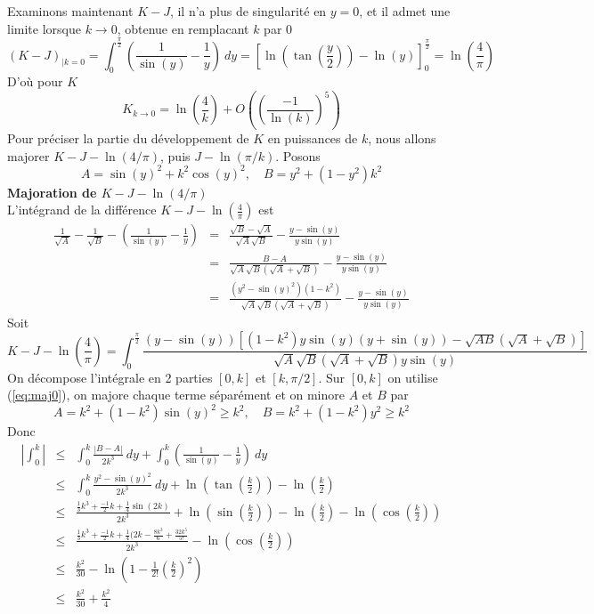 \documentclass[a4paper,11pt]{article}
\begin{document}
Examinons maintenant $K-J$, il n'a plus de singularit\'e en $y=0$, et il admet une limite
lorsque $k \rightarrow 0$, obtenue en remplacant $k$ par 0
\[ (K-J)_{|k=0} = \int_0^{\frac{\pi}{2}} \left(\frac{1}{\sin(y)}-\frac{1}{y}\right)
\ dy = \left[\ln\left(\tan\left(\frac{y}{2}\right)\right) - \ln(y) \right]_0^{\frac{\pi}{2}} =
\ln(\frac{4}{\pi})\]
D'o\`u pour $K$
\[ K_{k \rightarrow 0} = \ln\left(\frac{4}{k}\right) + O( \left(\frac{-1}{\ln(k)}\right)^5)\]
Pour pr\'eciser la partie du d\'eveloppement de $K$ en puissances de $k$, nous allons
majorer $K-J-\ln(4/\pi)$, puis $J-\ln(\pi/k)$.
Posons
\[ A=\sin(y)^2+k^2 \cos(y)^2, \quad B=y^2+(1-y^2)k^2\]
{\bf Majoration de $K-J-\ln(4/\pi)$}\\
L'int\'egrand de la diff\'erence $K-J-\ln(\frac{4}{\pi})$ est
\begin{eqnarray}  
\frac{1}{\sqrt{A}} - \frac{1}{\sqrt{B}} - 
\left( \frac{1}{\sin(y)}-\frac{1}{y} \right)
&= &
\frac{\sqrt{B}-\sqrt{A}}{\sqrt{A} \sqrt{B}} -
\frac{y-\sin(y)}{y\sin(y)} 
 \\
&= &
\frac{B-A}{\sqrt{A} \sqrt{B} (\sqrt{A}+\sqrt{B})} -
\frac{y-\sin(y)}{y\sin(y)} \label{eq:maj0}
 \\
&=& \frac{(y^2-\sin(y)^2)(1-k^2)}{\sqrt{A} \sqrt{B} (\sqrt{A}+\sqrt{B})}
- \frac{y-\sin(y)}{y\sin(y)} \label{eq:maj1}
\end{eqnarray}
Soit
\begin{equation} \label{eq:maj2}
 K-J-\ln(\frac{4}{\pi})= \int_0^{\frac{\pi}{2}} 
\frac{(y-\sin(y))[(1-k^2)y \sin(y)(y+\sin(y))-\sqrt{AB}(\sqrt{A}+\sqrt{B})]}
{\sqrt{A} \sqrt{B} (\sqrt{A}+\sqrt{B})y\sin(y)}
\end{equation}
On décompose l'intégrale en 2 parties $[0,k]$ et $[k,\pi/2]$.
Sur $[0,k]$ on utilise (\ref{eq:maj0}), on majore chaque terme séparément
et on minore $A$ et $B$ par
\[ A=k^2+(1-k^2)\sin(y)^2 \geq k^2, \quad B=k^2+(1-k^2)y^2 \geq k^2\]
Donc
\begin{eqnarray*} 
| \int_0^{k} | &\leq &\int_0^k \frac{|B-A|}{2k^3} \ dy + \int_0^k ( \frac{1}{\sin(y)}-\frac{1}{y} ) 
\ dy \\
&\leq& \int_0^k \frac{y^2-\sin(y)^2}{2k^3} \ dy + \ln (\tan(\frac{k}{2})) -\ln(\frac{k}{2}) \\
&\leq & \frac{\frac{1}{3} k^{3}+\frac{-1}{2} k+\frac{1}{4} \sin(2 k)}{2 k^{3}} 
+ \ln (\sin(\frac{k}{2})) -\ln(\frac{k}{2}) - \ln (\cos(\frac{k}{2}))
\\
&\leq & \frac{\frac{1}{3} k^{3}+\frac{-1}{2} k+\frac{1}{4} (2k-\frac{8k^3}{6}+\frac{32k^5}{5!}}{2 k^{3}} - \ln (\cos(\frac{k}{2})) \\
&\leq & \frac{k^2}{30}-  \ln (1- \frac{1}{2!}\left(\frac{k}{2}\right)^2) \\
&\leq &  \frac{k^2}{30} +\frac{k^2}{4}
\end{eqnarray*}
\end{document}
